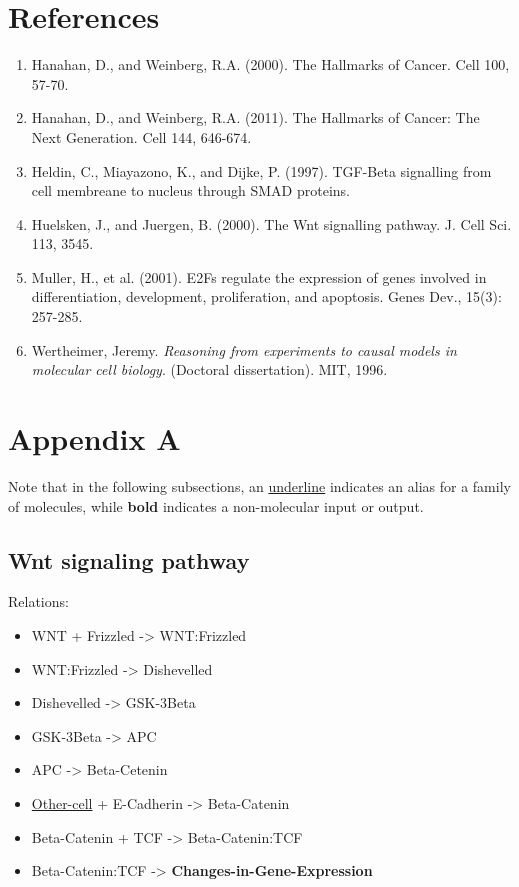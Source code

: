 \documentclass[11pt]{article}
\begin{document}
\section{References}
\label{sec-6}
\begin{enumerate}
\item Hanahan, D., and Weinberg, R.A. (2000). The Hallmarks of Cancer. Cell 100, 57-70.

\item Hanahan, D., and Weinberg, R.A. (2011). The Hallmarks of Cancer: The Next Generation. Cell 144, 646-674.

\item Heldin, C., Miayazono, K., and Dijke, P. (1997). TGF-Beta signalling from cell membreane to nucleus through SMAD proteins.

\item Huelsken, J., and Juergen, B. (2000). The Wnt signalling pathway. J. Cell Sci. 113, 3545.

\item Muller, H., et al. (2001). E2Fs regulate the expression of genes involved in differentiation, development, proliferation, and apoptosis. Genes Dev., 15(3): 257-285.

\item Wertheimer, Jeremy. \emph{Reasoning from experiments to causal models in molecular cell biology}. (Doctoral dissertation). MIT, 1996.
\end{enumerate}
\section{Appendix A}
\label{sec-7}
Note that in the following subsections, an \uline{underline} indicates an alias for a family of molecules, while \textbf{bold} indicates a non-molecular input or output.

\subsection{Wnt signaling pathway}
\label{sec-7-1}
Relations:
\begin{itemize}
\item WNT + Frizzled -> WNT:Frizzled
\item WNT:Frizzled -> Dishevelled
\item Dishevelled -> GSK-3Beta
\item GSK-3Beta -> APC
\item APC -> Beta-Cetenin
\item \uline{Other-cell} + E-Cadherin -> Beta-Catenin
\item Beta-Catenin + TCF -> Beta-Catenin:TCF
\item Beta-Catenin:TCF -> \textbf{Changes-in-Gene-Expression}
\end{itemize}
\end{document}
